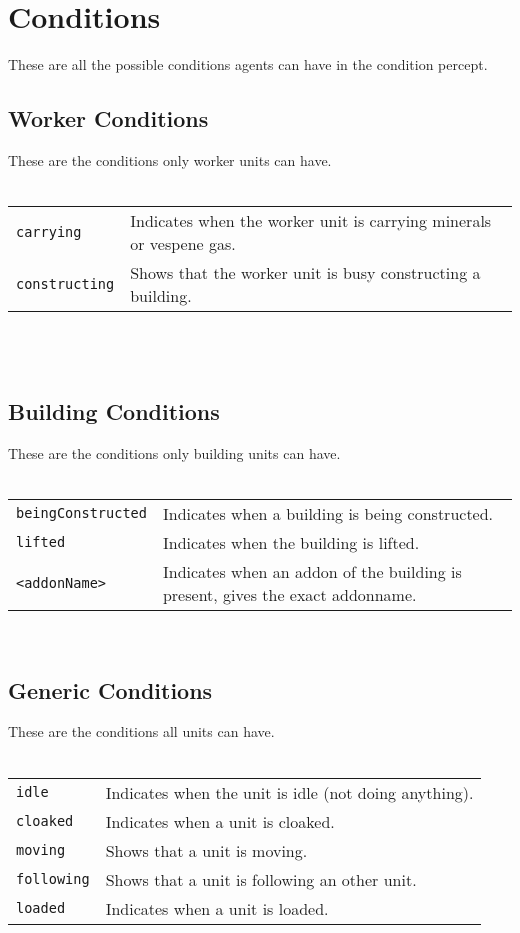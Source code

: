 \section{Conditions}
\label{conditions}
These are all the possible conditions agents can have in the condition percept.

\subsection{Worker Conditions}
These are the conditions only worker units can have.\\
\\
\begin{tabularx}{\textwidth}{lX}
 \verb|carrying| & Indicates when the worker unit is carrying minerals or vespene gas. \\
 \verb|constructing| & Shows that the worker unit is busy constructing a building.
\end{tabularx} \\
\\
\subsection{Building Conditions}
These are the conditions only building units can have.\\
\\
\begin{tabularx}{\textwidth}{lX}
 \verb|beingConstructed| & Indicates when a building is being constructed. \\
 \verb|lifted| & Indicates when the building is lifted. \\
 \verb|<addonName>| & Indicates when an addon of the building is present, gives the exact addonname.
\end{tabularx} \\

\subsection{Generic Conditions}
These are the conditions all units can have.\\
\\
\begin{tabularx}{\textwidth}{lX}
 \verb|idle| & Indicates when the unit is idle (not doing anything).\\
 \verb|cloaked| & Indicates when a unit is cloaked.\\
 \verb|moving| & Shows that a unit is moving.\\
 \verb|following| & Shows that a unit is following an other unit.\\
 \verb|loaded| & Indicates when a unit is loaded.\\
\end{tabularx} \\

